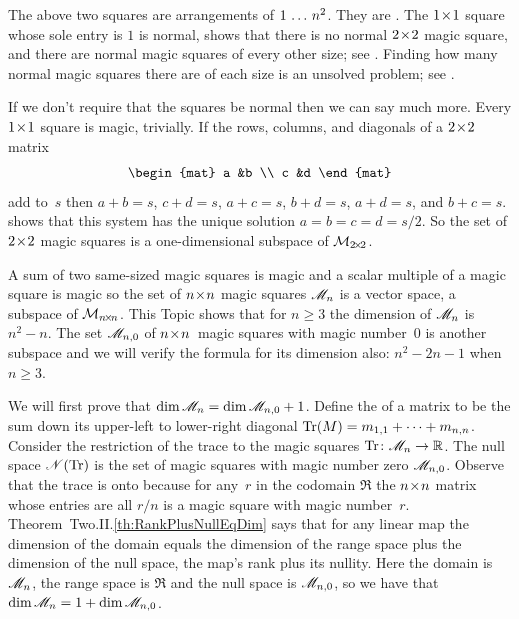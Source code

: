 The above two squares are arrangements of $1\,\ldots\, n^2$.
They are .
The $1 \! \times \! 1$ square whose sole entry is $1$ is normal, 
 shows that there is
no normal $2 \! \times \! 2$ magic square,
and there are normal magic squares of every other size; 
see \cite{WikipediaMagicSquare}.
Finding how many normal magic squares there are of each size is an unsolved
problem;
see \cite{OnlineEncyclopedia}.
 
If we don't require that the squares be normal then we can say much more.
Every $1 \! \times \! 1$ square is magic, trivially.
If the rows, columns, and diagonals of a $2 \! \times \! 2$ matrix 
\begin{equation*}
  \begin{mat}
    a  &b  \\
    c  &d
  \end{mat}
\end{equation*}
add to~$s$
then $a+b=s$, $c+d=s$, $a+c=s$, $b+d=s$, $a+d=s$, and $b+c=s$.
 shows that this
system has the unique solution $a=b=c=d=s/2$.
So the set of $2 \! \times \! 2$ magic squares
is a one-dimensional subspace of $\mathcal{M}_{2 \! \times \! 2}$.

A sum of two same-sized magic squares is magic and a 
scalar multiple of a magic square is magic so the set of 
$n \! \times \! n$ magic squares
$\mathscr{M}_n$ is a vector space, a subspace of $\mathcal{M}_{n \! \times \! n}$.
This Topic shows that for $n\geq 3$ the 
dimension of
$\mathscr{M}_n$ is $n^2-n$.
The set $\mathscr{M}_{n,0}$ of $n \! \times \! n$~magic squares with magic number~$0$ 
is another subspace and we will verify the formula for its dimension also:
$n^2-2n-1$ when $n\geq 3$.

We will first prove that $\dim\mathscr{M}_n=\dim\mathscr{M}_{n,0}+1$.
Define the 
 of a matrix to be
the sum down its upper-left to lower-right diagonal
$\operatorname{Tr} (M)=m_{1,1}+\cdots+m_{n,n}$.
Consider the restriction of the trace to the magic squares
$\mbox{$\operatorname{Tr}\colon \mathscr{M}_n\to \mathbb{R}$}$. 
The null space $\mathscr{N}(\operatorname{Tr})$ is the set of magic squares with magic
number zero 
$\mathscr{M}_{n,0}$.
Observe that the trace is onto because for any~$r$ in the 
codomain $\Re$ the $n \! \times \! n$ matrix whose entries are all $r/n$ is
a magic square with magic number~$r$.
Theorem~Two.II.\ref{th:RankPlusNullEqDim} says that for any linear map the
dimension of the domain equals the dimension of the range space 
plus the dimension of the null space,
the map's rank plus its nullity.
Here the domain is $\mathscr{M}_n$, the range space is 
$\Re$ and the null space is $\mathscr{M}_{n,0}$,
so we have that $\dim\mathscr{M}_n=1+\dim\mathscr{M}_{n,0}$.

